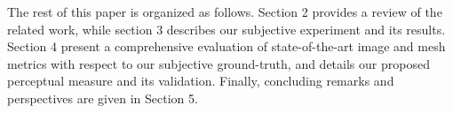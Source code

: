 The rest of this paper is organized as follows. Section 2 provides a review of the related work, while section 3 describes our subjective experiment and its results. Section 4 present a comprehensive evaluation of state-of-the-art image and mesh metrics with respect to our subjective ground-truth, and details our proposed perceptual measure and its validation. Finally, concluding remarks and perspectives are given in Section 5.